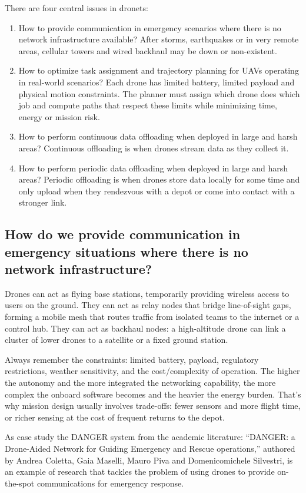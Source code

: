 There are four central issues in dronets:
\begin{enumerate}
    \item How to provide communication in emergency scenarios where there is no network infrastructure available? After storms, earthquakes or in very remote areas, cellular towers and wired backhaul may be down or non-existent.
    \item How to optimize task assignment and trajectory planning for UAVs operating in real-world scenarios? Each drone has limited battery, limited payload and physical motion constraints. The planner must assign which drone does which job and compute paths that respect these limits while minimizing time, energy or mission risk.
    \item How to perform continuous data offloading when deployed in large and harsh areas? Continuous offloading is when drones stream data as they collect it.
    \item How to perform periodic data offloading when deployed in large and harsh areas? Periodic offloading is when drones store data locally for some time and only upload when they rendezvous with a depot or come into contact with a stronger link.
\end{enumerate}

\subsection{How do we provide communication in emergency situations where there is no network infrastructure?}
Drones can act as flying base stations, temporarily providing wireless access to users on the ground. They can act as relay nodes that bridge line-of-sight gaps, forming a mobile mesh that routes traffic from isolated teams to the internet or a control hub. They can act as backhaul nodes: a high-altitude drone can link a cluster of lower drones to a satellite or a fixed ground station.

Always remember the constraints: limited battery, payload, regulatory restrictions, weather sensitivity, and the cost/complexity of operation. The higher the autonomy and the more integrated the networking capability, the more complex the onboard software becomes and the heavier the energy burden. That’s why mission design usually involves trade-offs: fewer sensors and more flight time, or richer sensing at the cost of frequent returns to the depot.

As case study the DANGER system from the academic literature: “DANGER: a Drone-Aided Network for Guiding Emergency and Rescue operations,” authored by Andrea Coletta, Gaia Maselli, Mauro Piva and Domenicomichele Silvestri, is an example of research that tackles the problem of using drones to provide on-the-spot communications for emergency response.

